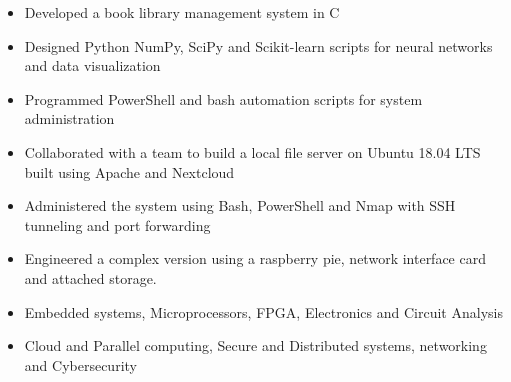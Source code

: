 \documentclass[11pt,a4paper,ragged2e]{altacv}
\begin{document}
\begin{paracol}{1}
\begin{itemize}
\item Developed a book library management system in C 
\item Designed Python NumPy, SciPy and Scikit-learn scripts for neural networks and data visualization
\item Programmed PowerShell and bash automation scripts for system administration
\end{itemize}
\tightdivider

\begin{itemize}
\item Collaborated with a team to build a local file server on Ubuntu 18.04 LTS built using Apache and Nextcloud
\item Administered the system using Bash, PowerShell and Nmap with SSH tunneling and port forwarding
\item Engineered a complex version using a raspberry pie, network interface card and attached storage.
\end{itemize}

\medskip

\begin{itemize}
\item Embedded systems, Microprocessors, FPGA, Electronics and Circuit Analysis
\item Cloud and Parallel computing, Secure and Distributed systems, networking and Cybersecurity
\end{itemize}




\end{paracol}
\end{document}
